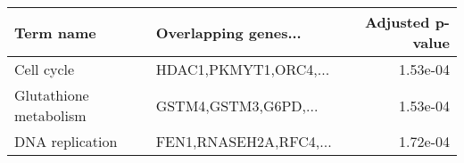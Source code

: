 \begin{tabular}{llr}
\toprule
             Term name &   Overlapping genes... &  Adjusted p-value \\
\midrule
            Cell cycle &  HDAC1,PKMYT1,ORC4,... &          1.53e-04 \\
Glutathione metabolism &   GSTM4,GSTM3,G6PD,... &          1.53e-04 \\
       DNA replication & FEN1,RNASEH2A,RFC4,... &          1.72e-04 \\
\bottomrule
\end{tabular}
